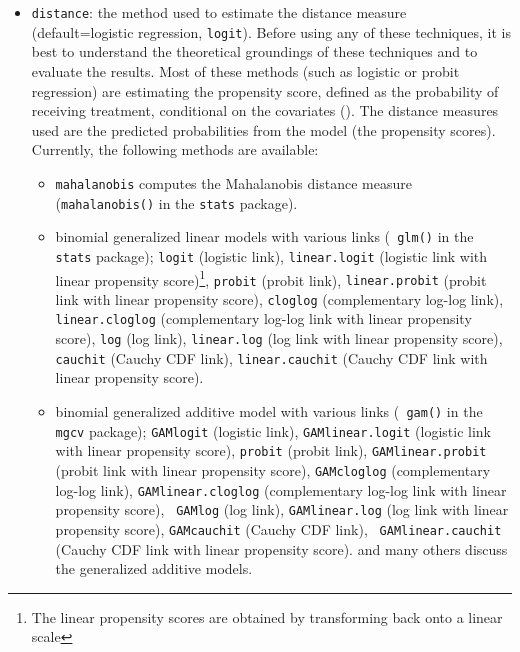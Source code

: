 \begin{itemize}
  
\item \texttt{distance}: the method used to estimate the distance
  measure (default=logistic regression, {\tt logit}).  Before using
  any of these techniques, it is best to understand the theoretical
  groundings of these techniques and to evaluate the results.  Most of
  these methods (such as logistic or probit regression) are estimating
  the propensity score, defined as the probability of receiving
  treatment, conditional on the covariates (\cite{RosRub83}).  The
  distance measures used are the predicted probabilities from the
  model (the propensity scores).  Currently, the following methods are
  available:
  \begin{itemize}
  \item {\tt mahalanobis} computes the Mahalanobis distance measure
    ({\tt mahalanobis()} in the {\tt stats} package).
  \item binomial generalized linear models with various links ({\tt
      glm()} in the {\tt stats} package); \texttt{logit} (logistic
    link), {\tt linear.logit} (logistic link with linear propensity
    score)\footnote{The linear propensity scores are obtained by
      transforming back onto a linear scale}, \texttt{probit} (probit
    link), {\tt linear.probit} (probit link with linear propensity
    score), {\tt cloglog} (complementary log-log link), {\tt
      linear.cloglog} (complementary log-log link with linear
    propensity score), {\tt log} (log link), {\tt linear.log} (log
    link with linear propensity score), {\tt cauchit} (Cauchy CDF
    link), {\tt linear.cauchit} (Cauchy CDF link with linear
    propensity score).

  \item binomial generalized additive model with various links ({\tt
      gam()} in the {\tt mgcv} package); \texttt{GAMlogit} (logistic
    link), {\tt GAMlinear.logit} (logistic link with linear propensity
    score), \texttt{probit} (probit link), {\tt GAMlinear.probit}
    (probit link with linear propensity score), {\tt GAMcloglog}
    (complementary log-log link), {\tt GAMlinear.cloglog}
    (complementary log-log link with linear propensity score), {\tt
      GAMlog} (log link), {\tt GAMlinear.log} (log link with linear
    propensity score), {\tt GAMcauchit} (Cauchy CDF link), {\tt
      GAMlinear.cauchit} (Cauchy CDF link with linear propensity
    score). \citet{HasTib90,BecJac98} and many others discuss the
    generalized additive models.


\end{itemize}
\end{itemize}
